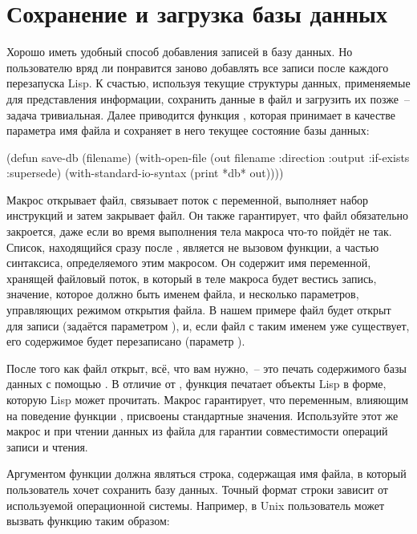 \section{Сохранение и загрузка базы данных}

Хорошо иметь удобный способ добавления записей в базу данных. Но пользователю вряд ли
понравится заново добавлять все записи после каждого перезапуска Lisp. К счастью,
используя текущие структуры данных, применяемые для представления информации, сохранить
данные в файл и загрузить их позже~-- задача тривиальная. Далее приводится функция
, которая принимает в качестве параметра имя файла и сохраняет в него
текущее состояние базы данных:

\begin{myverb}
(defun save-db (filename)
  (with-open-file (out filename
                   :direction :output
                   :if-exists :supersede)
    (with-standard-io-syntax
      (print *db* out))))
\end{myverb}

Макрос  открывает файл, связывает поток с переменной, выполняет
набор инструкций и затем закрывает файл. Он также гарантирует, что файл обязательно
закроется, даже если во время выполнения тела макроса что-то пойдёт не так. Список,
находящийся сразу после , является не вызовом функции, а частью
синтаксиса, определяемого этим макросом. Он содержит имя переменной, хранящей файловый
поток, в который в теле макроса  будет вестись запись, значение,
которое должно быть именем файла, и несколько параметров, управляющих режимом открытия
файла. В нашем примере файл будет открыт для записи (задаётся параметром 
), и, если файл с таким именем уже существует, его содержимое будет
перезаписано (параметр  ).

После того как файл открыт, всё, что вам нужно,~-- это печать содержимого базы данных с
помощью . В отличие от , функция 
печатает объекты Lisp в форме, которую Lisp может прочитать. Макрос
 гарантирует, что переменным, влияющим на поведение
функции , присвоены стандартные значения. Используйте этот же макрос и при
чтении данных из файла для гарантии совместимости операций записи и чтения.

Аргументом функции  должна являться строка, содержащая имя файла, в который
пользователь хочет сохранить базу данных. Точный формат строки зависит от используемой
операционной системы. Например, в Unix пользователь может вызвать функцию 
таким образом:

